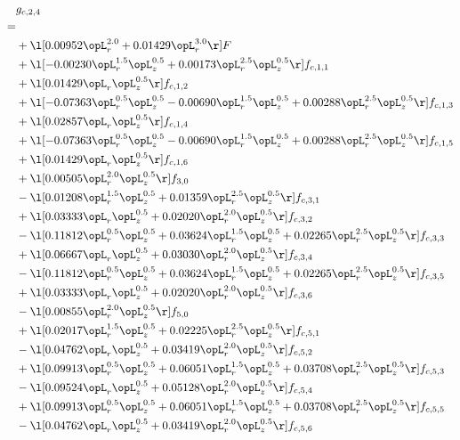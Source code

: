 \begin{alignat}{2} 
\label{eq:g_24_0} 
& g_{c,2,4} \nonumber \\ 
 = \\ 
& + \l[  0.00952 \opL_r^{2.0} +  0.01429 \opL_r^{3.0}  \r] F \nonumber \\ 
& + \l[  -0.00230 \opL_r^{1.5} \opL_z^{0.5} +  0.00173 \opL_r^{2.5} \opL_z^{0.5}  \r] f_{c,1,1} \nonumber \\ 
& + \l[  0.01429 \opL_r \opL_z^{0.5}  \r] f_{c,1,2} \nonumber \\ 
& + \l[  -0.07363 \opL_r^{0.5} \opL_z^{0.5}   -0.00690 \opL_r^{1.5} \opL_z^{0.5} +  0.00288 \opL_r^{2.5} \opL_z^{0.5}  \r] f_{c,1,3} \nonumber \\ 
& + \l[  0.02857 \opL_r \opL_z^{0.5}  \r] f_{c,1,4} \nonumber \\ 
& + \l[  -0.07363 \opL_r^{0.5} \opL_z^{0.5}   -0.00690 \opL_r^{1.5} \opL_z^{0.5} +  0.00288 \opL_r^{2.5} \opL_z^{0.5}  \r] f_{c,1,5} \nonumber \\ 
& + \l[  0.01429 \opL_r \opL_z^{0.5}  \r] f_{c,1,6} \nonumber \\ 
& + \l[  0.00505 \opL_r^{2.0} \opL_z^{0.5}  \r] f_{3,0} \nonumber \\ 
& - \l[  0.01208 \opL_r^{1.5} \opL_z^{0.5} +  0.01359 \opL_r^{2.5} \opL_z^{0.5}  \r] f_{c,3,1} \nonumber \\ 
& + \l[  0.03333 \opL_r \opL_z^{0.5} +  0.02020 \opL_r^{2.0} \opL_z^{0.5}  \r] f_{c,3,2} \nonumber \\ 
& - \l[  0.11812 \opL_r^{0.5} \opL_z^{0.5} +  0.03624 \opL_r^{1.5} \opL_z^{0.5} +  0.02265 \opL_r^{2.5} \opL_z^{0.5}  \r] f_{c,3,3} \nonumber \\ 
& + \l[  0.06667 \opL_r \opL_z^{0.5} +  0.03030 \opL_r^{2.0} \opL_z^{0.5}  \r] f_{c,3,4} \nonumber \\ 
& - \l[  0.11812 \opL_r^{0.5} \opL_z^{0.5} +  0.03624 \opL_r^{1.5} \opL_z^{0.5} +  0.02265 \opL_r^{2.5} \opL_z^{0.5}  \r] f_{c,3,5} \nonumber \\ 
& + \l[  0.03333 \opL_r \opL_z^{0.5} +  0.02020 \opL_r^{2.0} \opL_z^{0.5}  \r] f_{c,3,6} \nonumber \\ 
& - \l[  0.00855 \opL_r^{2.0} \opL_z^{0.5}  \r] f_{5,0} \nonumber \\ 
& + \l[  0.02017 \opL_r^{1.5} \opL_z^{0.5} +  0.02225 \opL_r^{2.5} \opL_z^{0.5}  \r] f_{c,5,1} \nonumber \\ 
& - \l[  0.04762 \opL_r \opL_z^{0.5} +  0.03419 \opL_r^{2.0} \opL_z^{0.5}  \r] f_{c,5,2} \nonumber \\ 
& + \l[  0.09913 \opL_r^{0.5} \opL_z^{0.5} +  0.06051 \opL_r^{1.5} \opL_z^{0.5} +  0.03708 \opL_r^{2.5} \opL_z^{0.5}  \r] f_{c,5,3} \nonumber \\ 
& - \l[  0.09524 \opL_r \opL_z^{0.5} +  0.05128 \opL_r^{2.0} \opL_z^{0.5}  \r] f_{c,5,4} \nonumber \\ 
& + \l[  0.09913 \opL_r^{0.5} \opL_z^{0.5} +  0.06051 \opL_r^{1.5} \opL_z^{0.5} +  0.03708 \opL_r^{2.5} \opL_z^{0.5}  \r] f_{c,5,5} \nonumber \\ 
& - \l[  0.04762 \opL_r \opL_z^{0.5} +  0.03419 \opL_r^{2.0} \opL_z^{0.5}  \r] f_{c,5,6} \nonumber \\ 
\end{alignat} 


